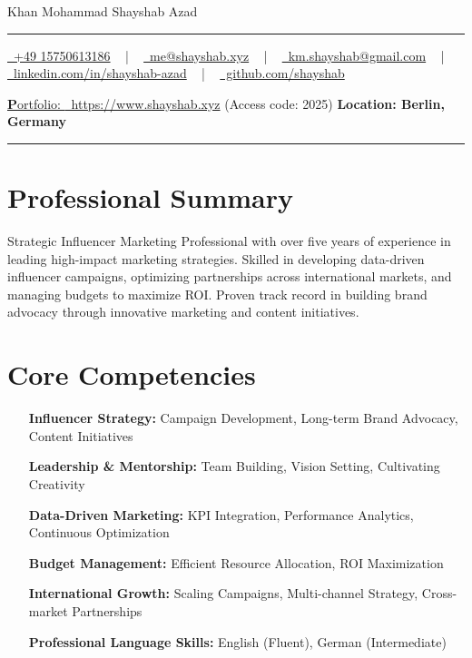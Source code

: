 \documentclass[letterpaper,10pt]{article}
\newcommand{\documentTitle}[2]{
  \begin{center}
    {\Huge\color{accentTitle} #1}
    \vspace{10pt}
    {\color{accentLine} \hrule}
    \vspace{2pt}
    \footnotesize{#2}
    \vspace{2pt}
    {\color{accentLine} \hrule}
  \end{center}
}
\begin{document}
  \documentTitle{Khan Mohammad Shayshab Azad}{
    \href{tel:+49 15750613186}{
      \raisebox{-0.05\height} \faPhone\ +49 15750613186} ~ | ~
      \href{mailto:km.shayshab@gmail.com}{
      \raisebox{-0.15\height} \faEnvelope\ me@shayshab.xyz} ~ | ~
    \href{mailto:me@shayshab.xyz}{
      \raisebox{-0.15\height} \faEnvelope\ km.shayshab@gmail.com} ~ | ~
    \href{https://linkedin.com/in/shayshab-azad/}{
      \raisebox{-0.15\height} \faLinkedin\ linkedin.com/in/shayshab-azad} ~ | ~
    \href { https://github.com/shayshab}{
      \raisebox{-0.15\height} \faGithub \ github.com/shayshab} 
     
      \href{https://www.shayshab.xyz/}{
      \raisebox{-0.15\height} {\textbf Portfolio: }\ https://www.shayshab.xyz}{ (Access code: 2025)}
    \textbf{ Location: Berlin, Germany}
  }



\section*{Professional Summary}
Strategic Influencer Marketing Professional with over five years of experience in leading high-impact marketing strategies. Skilled in developing data-driven influencer campaigns, optimizing partnerships across international markets, and managing budgets to maximize ROI. Proven track record in building brand advocacy through innovative marketing and content initiatives.

   \section{Core Competencies}

  \begin{itemize}[itemsep=-2px, parsep=1pt, leftmargin=120 pt]
   
    \item[\textbf{Influencer Strategy:}] Campaign Development, Long-term Brand Advocacy, Content Initiatives
    \item[\textbf{Leadership & Mentorship:}] Team Building, Vision Setting, Cultivating Creativity
    \item[\textbf{Data-Driven Marketing:}] KPI Integration, Performance Analytics, Continuous Optimization
    \item[\textbf{Budget Management:}] Efficient Resource Allocation, ROI Maximization
    \item[\textbf{International Growth:}] Scaling Campaigns, Multi-channel Strategy, Cross-market Partnerships
    \item[\textbf{Professional Language Skills:}] English (Fluent), German (Intermediate)
  \end{itemize}
\end{document}

